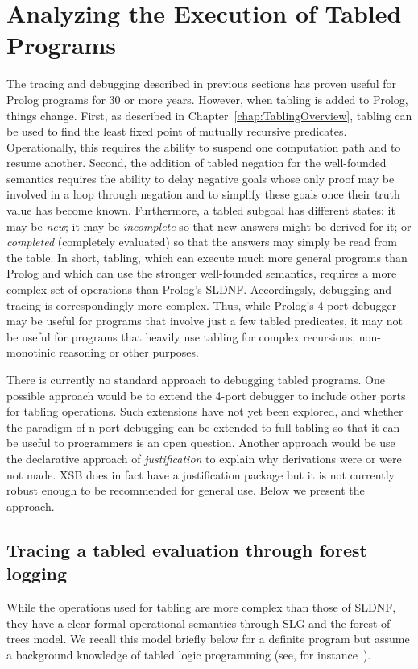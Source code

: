 \section{Analyzing the Execution of Tabled Programs} \label{sec:forest-trace}
%
The tracing and debugging described in previous sections has proven
useful for Prolog programs for 30 or more years.  However, when
tabling is added to Prolog, things change.  First, as described in
Chapter~\ref{chap:TablingOverview}, tabling can be used to find the
least fixed point of mutually recursive predicates.  Operationally,
this requires the ability to suspend one computation path and to
resume another.  Second, the addition of tabled negation for the
well-founded semantics requires the ability to delay negative goals
whose only proof may be involved in a loop through negation and to
simplify these goals once their truth value has become
known. Furthermore, a tabled subgoal has different states: it may be
{\em new}; it may be {\em incomplete} so that new answers might be
derived for it; or {\em completed} (completely evaluated) so that the
answers may simply be read from the table.  In short, tabling, which
can execute much more general programs than Prolog and which can use
the stronger well-founded semantics, requires a more complex set of
operations than Prolog's SLDNF.  Accordingsly, debugging and tracing
is correspondingly more complex.  Thus, while Prolog's 4-port debugger
may be useful for programs that involve just a few tabled predicates,
it may not be useful for programs that heavily use tabling for complex
recursions, non-monotinic reasoning or other purposes.

There is currently no standard approach to debugging tabled programs.
One possible approach would be to extend the 4-port debugger to
include other ports for tabling operations.  Such extensions have not
yet been explored, and whether the paradigm of n-port debugging can be
extended to full tabling so that it can be useful to programmers is an
open question.  Another approach would be use the declarative approach
of {\em justification} \cite{GuRR01,PGDRR04} to explain why
derivations were or were not made.  XSB does in fact have a
justification package but it is not currently robust enough to be
recommended for general use.  Below we present the {\tt \ctrace}
approach.

\subsection{Tracing a tabled evaluation through forest logging}
%
While the operations used for tabling are more complex than those of
SLDNF, they have a clear formal operational semantics through SLG and
the forest-of-trees model.  We recall this model briefly below for a
definite program but assume a background knowledge of tabled logic
programming (see, for instance~\cite{SwiW12}).

